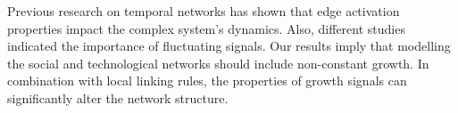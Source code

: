 Previous research on temporal networks \cite{holme2012} has shown that edge activation properties impact the complex system's dynamics. Also, different studies indicated the importance of fluctuating signals. Our results imply that modelling the social and technological networks should include non-constant growth. In combination with local linking rules, the properties of growth signals can significantly alter the network structure. 



